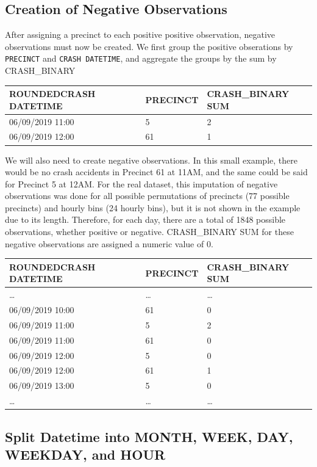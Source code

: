 \hypertarget{creation-of-negative-observations}{%
\subsection{Creation of Negative
Observations}\label{creation-of-negative-observations}}

After assigning a precinct to each positive positive observation,
negative observations must now be created. We first group the positive
obserations by \texttt{PRECINCT} and \texttt{CRASH\ DATETIME}, and
aggregate the groups by the sum by CRASH\_BINARY

\begin{longtable}[]{@{}lll@{}}
\toprule
ROUNDEDCRASH DATETIME & PRECINCT & CRASH\_BINARY SUM\tabularnewline
\midrule
\endhead
06/09/2019 11:00 & 5 & 2\tabularnewline
06/09/2019 12:00 & 61 & 1\tabularnewline
\bottomrule
\end{longtable}

We will also need to create negative observations. In this small
example, there would be no crash accidents in Precinct 61 at 11AM, and
the same could be said for Precinct 5 at 12AM. For the real dataset,
this imputation of negative observations was done for all possible
permutations of precincts (77 possible precincts) and hourly bins (24
hourly bins), but it is not shown in the example due to its length.
Therefore, for each day, there are a total of 1848 possible
observations, whether positive or negative. CRASH\_BINARY SUM for these
negative observations are assigned a numeric value of 0.

\begin{longtable}[]{@{}lll@{}}
\toprule
ROUNDEDCRASH DATETIME & PRECINCT & CRASH\_BINARY SUM\tabularnewline
\midrule
\endhead
\ldots{} & \ldots{} & \ldots{}\tabularnewline
06/09/2019 10:00 & 61 & 0\tabularnewline
06/09/2019 11:00 & 5 & 2\tabularnewline
06/09/2019 11:00 & 61 & 0\tabularnewline
06/09/2019 12:00 & 5 & 0\tabularnewline
06/09/2019 12:00 & 61 & 1\tabularnewline
06/09/2019 13:00 & 5 & 0\tabularnewline
\ldots{} & \ldots{} & \ldots{}\tabularnewline
\bottomrule
\end{longtable}

\hypertarget{split-datetime-into-month-week-day-weekday-and-hour}{%
\subsection{Split Datetime into MONTH, WEEK, DAY, WEEKDAY, and
HOUR}\label{split-datetime-into-month-week-day-weekday-and-hour}}

